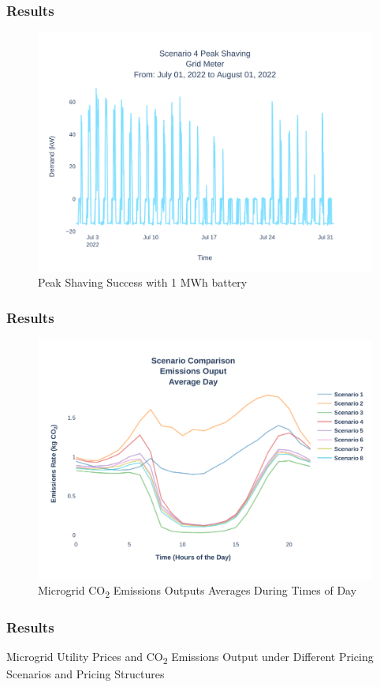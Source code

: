 \documentclass[aspectratio=169, 8 pt]{beamer}
\begin{document}
		\begin{frame}
			\frametitle{Results}
			\begin{figure}
				\centering
				\includegraphics[width=0.7\linewidth]{Fig/scenario_4_peak_shaving}
				\caption{Peak Shaving Success with 1 MWh battery}
				\label{fig:scenario4peakshaving}
			\end{figure}
			
		\end{frame}
	
		\begin{frame}
			\frametitle{Results}
			\begin{figure}
				\centering
				\includegraphics[width=0.7\linewidth]{Fig/emissions_scenario_comparison_run_3}
				\caption{Microgrid  CO\textsubscript{2} Emissions Outputs Averages During Times of Day}
				\label{fig:emissionsscenariocomparison}
			\end{figure}
		\end{frame}
	
		\begin{frame}
			\frametitle{Results}
			\begin{table}
				\caption{Microgrid Utility Prices and CO\textsubscript{2} Emissions Output under Different Pricing Scenarios and Pricing Structures}
				\centering
				
				\label{tab:emissions}
			\end{table}
		\end{frame}
	
\end{document}
